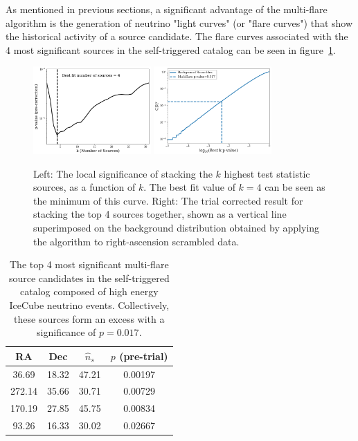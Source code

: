 As mentioned in previous sections, a significant advantage of the multi-flare algorithm is the generation of neutrino "light curves" (or "flare curves") that show the historical activity of a source candidate. The flare curves associated with the 4 most significant sources in the self-triggered catalog can be seen in figure~\ref{fig:stresults}.

\begin{figure}[h]
\centering
\includegraphics[width=0.4\textwidth]{figs/st_pcurve.png}
\includegraphics[width=0.4\textwidth]{figs/st_obsresult.png}
\caption{Left: The local significance of stacking the $k$ highest test statistic sources, as a function of $k$. The best fit value of $k=4$ can be seen as the minimum of this curve. Right: The trial corrected result for stacking the top 4 sources together, shown as a vertical line superimposed on the background distribution obtained by applying the algorithm to right-ascension scrambled data.}
\label{fig:stresults}
\end{figure}

\begin{table}[h!]
\centering
 \begin{tabular}{||c c c c||} 
 \hline
 RA & Dec & $\hat{n}_s$ & $p$ (pre-trial) \\ [0.5ex] 
 \hline\hline
 36.69 & 18.32 & 47.21 & 0.00197 \\ 
 \hline
 272.14 & 35.66 & 30.71 & 0.00729 \\
 \hline
 170.19 & 27.85 & 45.75 & 0.00834 \\
 \hline
 93.26 & 16.33 & 30.02 & 0.02667 \\
 \hline
\end{tabular}
\caption{The top 4 most significant multi-flare source candidates in the self-triggered catalog composed of high energy IceCube neutrino events. Collectively, these sources form an excess with a significance of $p=0.017$.}
\label{tab:stresults}
\end{table}


